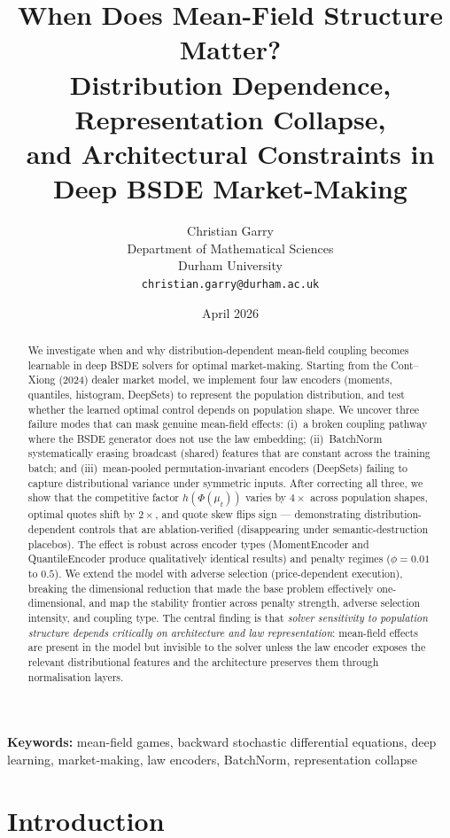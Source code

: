 \documentclass[11pt,a4paper]{article}
\title{When Does Mean-Field Structure Matter?\\Distribution Dependence, Representation Collapse,\\and Architectural Constraints in Deep BSDE Market-Making}
\author{
  Christian Garry \\
  Department of Mathematical Sciences \\
  Durham University \\
  \texttt{christian.garry@durham.ac.uk}
}
\date{April 2026}
\begin{document}
\maketitle

\begin{abstract}
We investigate when and why distribution-dependent mean-field coupling becomes learnable in deep BSDE solvers for optimal market-making. Starting from the Cont--Xiong (2024) dealer market model, we implement four law encoders (moments, quantiles, histogram, DeepSets) to represent the population distribution, and test whether the learned optimal control depends on population shape. We uncover three failure modes that can mask genuine mean-field effects: (i)~a broken coupling pathway where the BSDE generator does not use the law embedding; (ii)~BatchNorm systematically erasing broadcast (shared) features that are constant across the training batch; and (iii)~mean-pooled permutation-invariant encoders (DeepSets) failing to capture distributional variance under symmetric inputs. After correcting all three, we show that the competitive factor $h(\Phi(\mu_t))$ varies by $4\times$ across population shapes, optimal quotes shift by $2\times$, and quote skew flips sign --- demonstrating distribution-dependent controls that are ablation-verified (disappearing under semantic-destruction placebos). The effect is robust across encoder types (MomentEncoder and QuantileEncoder produce qualitatively identical results) and penalty regimes ($\phi = 0.01$ to $0.5$). We extend the model with adverse selection (price-dependent execution), breaking the dimensional reduction that made the base problem effectively one-dimensional, and map the stability frontier across penalty strength, adverse selection intensity, and coupling type. The central finding is that \emph{solver sensitivity to population structure depends critically on architecture and law representation}: mean-field effects are present in the model but invisible to the solver unless the law encoder exposes the relevant distributional features and the architecture preserves them through normalisation layers.
\end{abstract}

\noindent\textbf{Keywords:} mean-field games, backward stochastic differential equations, deep learning, market-making, law encoders, BatchNorm, representation collapse

\section{Introduction}
\label{sec:intro}
\end{document}
